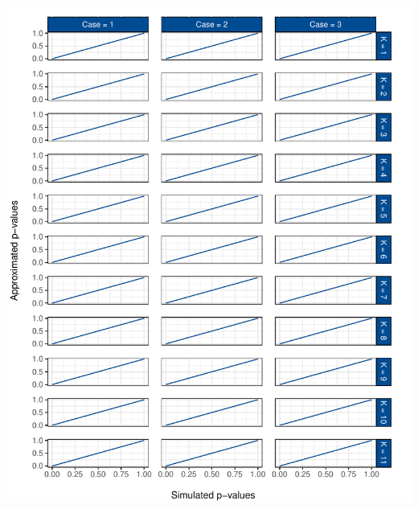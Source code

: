 \documentclass[12pt,a4paper]{article}
\let\origfigure\figure
\let\endorigfigure\endfigure
\renewenvironment{figure}[1][2] {
    \expandafter\origfigure\expandafter[H]
} {
    \endorigfigure
}
\begin{document}
\begin{figure}
\centering
\includegraphics{p_approx_paper_files/figure-latex/approx_sim-all-1.pdf}
\caption{\label{fig:sim_approx_all} Simulated against approximated
\(p\)-values over the whole distribution for the first case and all
underlying tests included.}
\end{figure}
\end{document}
